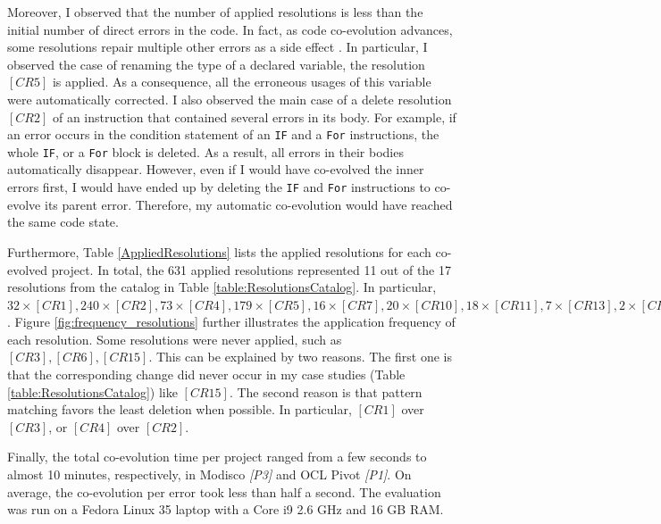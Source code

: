 Moreover, I observed that the number of applied resolutions is less than the initial number of direct errors in the code. In fact, as code co-evolution advances, some resolutions repair multiple other errors as a side effect \cite{cuadrado2018quick,khelladi2019detecting}. 
In particular, I observed the case of renaming the type of a declared variable, the resolution $[CR5]$ is applied. As a consequence, all the erroneous usages of this variable were automatically corrected. I also observed the main case of a delete resolution $[CR2]$ of an instruction that contained several errors in its body.
For example, if an error occurs in the condition statement of an \texttt{IF} and a \texttt{For} instructions, the whole \texttt{IF}, or a \texttt{For} block is deleted. As a result, all errors in their bodies automatically disappear. However, even if I would have co-evolved the inner errors first, I would have ended up by deleting the \texttt{IF} and \texttt{For} instructions to co-evolve its parent error. Therefore, my automatic co-evolution would have reached the same code state. 

Furthermore, Table \ref{AppliedResolutions} lists the applied resolutions for each co-evolved project. In total, the 631 applied resolutions represented 11 out of the 17 resolutions from the catalog in Table \ref{table:ResolutionsCatalog}. 
In particular, $32 \times [CR1], 240 \times [CR2], 73 \times [CR4], 179 \times [CR5], 16 \times [CR7], 20 \times [CR10], 18 \times [CR11], 7 \times [CR13], 2 \times [CR14], 3 \times [CR16], 13 \times [CR17]$. 
%
Figure \ref{fig:frequency_resolutions} further illustrates the application frequency of each resolution. Some resolutions were never applied, such as $[CR3], [CR6], [CR15]$. This can be explained by two reasons. The first one is that the corresponding change did never occur in my case studies (Table \ref{table:ResolutionsCatalog}) like $[CR15]$. The second reason is that pattern matching favors the least deletion when possible. In particular, $[CR1]$ over $[CR3]$, or $[CR4]$ over $[CR2]$.


Finally, the total co-evolution time per project ranged from a few seconds to almost 10 minutes, respectively, in Modisco  \emph{[P3]} and OCL Pivot \emph{[P1]}. On average, the co-evolution per error took less than half a second. The evaluation was run on a Fedora Linux 35 laptop with a Core i9 2.6 GHz and 16 GB RAM.


